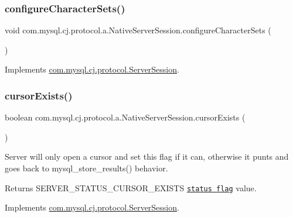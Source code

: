 \subsubsection{\texorpdfstring{configure\+Character\+Sets()}{configureCharacterSets()}}
{\footnotesize\ttfamily void com.\+mysql.\+cj.\+protocol.\+a.\+Native\+Server\+Session.\+configure\+Character\+Sets (\begin{DoxyParamCaption}{ }\end{DoxyParamCaption})}



Implements \mbox{\hyperlink{interfacecom_1_1mysql_1_1cj_1_1protocol_1_1_server_session_abcad1a4dec7e1822b0d4c52fdb0feb7d}{com.\+mysql.\+cj.\+protocol.\+Server\+Session}}.

\mbox{\label{classcom_1_1mysql_1_1cj_1_1protocol_1_1a_1_1_native_server_session_a9e04d0827dc182b812bde510a82952c1}} 
\subsubsection{\texorpdfstring{cursor\+Exists()}{cursorExists()}}
{\footnotesize\ttfamily boolean com.\+mysql.\+cj.\+protocol.\+a.\+Native\+Server\+Session.\+cursor\+Exists (\begin{DoxyParamCaption}{ }\end{DoxyParamCaption})}

Server will only open a cursor and set this flag if it can, otherwise it punts and goes back to mysql\+\_\+store\+\_\+results() behavior.

\begin{DoxyReturn}{Returns}
S\+E\+R\+V\+E\+R\+\_\+\+S\+T\+A\+T\+U\+S\+\_\+\+C\+U\+R\+S\+O\+R\+\_\+\+E\+X\+I\+S\+TS \href{http://dev.mysql.com/doc/internals/en/status-flags.html}{\tt status flag} value. 
\end{DoxyReturn}


Implements \mbox{\hyperlink{interfacecom_1_1mysql_1_1cj_1_1protocol_1_1_server_session_aee37dfcad7c37e0b031da85b7f638435}{com.\+mysql.\+cj.\+protocol.\+Server\+Session}}.

